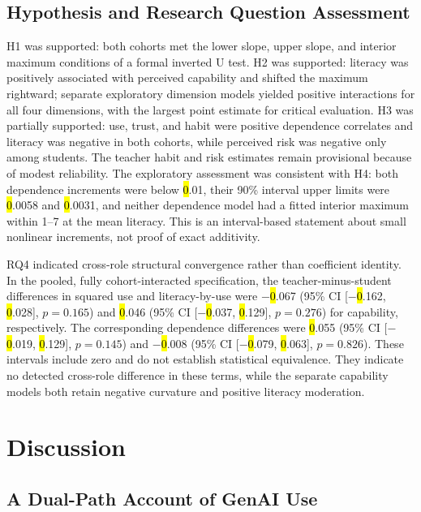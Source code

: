 \documentclass[sustainability,article,accept,moreauthors]{Definitions/mdpi}
\begin{document}
\subsection{Hypothesis and Research Question Assessment}\label{sec:hypotheses}

H1 was supported: both cohorts met the lower slope, upper slope, and interior maximum conditions of a formal inverted U test. H2 was supported: literacy was positively associated with perceived capability and shifted the maximum rightward; separate exploratory dimension models yielded positive interactions for all four dimensions, with the largest point estimate for critical evaluation. H3 was partially supported: use, trust, and habit were positive dependence correlates and literacy was negative in both cohorts, while perceived risk was negative only among students. The teacher habit and risk estimates remain provisional because of modest reliability. The exploratory assessment was consistent with H4: both dependence increments were below \hl{0}.01, their 90\% interval upper limits were \hl{0}.0058 and \hl{0}.0031, and neither dependence model had a fitted interior maximum within 1--7 at the mean literacy. This is an interval-based statement about small nonlinear increments, not proof of exact additivity.

RQ4 indicated cross-role structural convergence rather than coefficient identity. In the pooled, fully cohort-interacted specification, the teacher-minus-student differences in squared use and literacy-by-use were $-$\hl{0}.067 (95\% CI [$-$\hl{0}.162, \hl{0}.028], $p=0.165$) and \hl{0}.046 (95\% CI [$-$\hl{0}.037, \hl{0}.129], $p=0.276$) for capability, respectively. The corresponding dependence differences were \hl{0}.055 (95\% CI [$-$\hl{0}.019, \hl{0}.129], $p=0.145$) and $-$\hl{0}.008 (95\% CI [$-$\hl{0}.079, \hl{0}.063], $p=0.826$). These intervals include zero and do not establish statistical equivalence. They indicate no detected cross-role difference in these terms, while the separate capability models both retain negative curvature and positive literacy moderation.

\section{Discussion}\label{sec:discussion}

\subsection{A Dual-Path Account of GenAI Use}\label{sec:dualpath}
\end{document}
